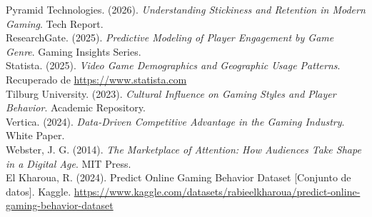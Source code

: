 \documentclass[oneside,11pt]{Latex/Classes/PhDthesisPSnPDF}
\begin{document}
Pyramid Technologies. (2026). \emph{Understanding Stickiness and
Retention in Modern Gaming}. Tech Report.\\

ResearchGate. (2025). \emph{Predictive Modeling of Player Engagement by
Game Genre}. Gaming Insights Series.\\

Statista. (2025). \emph{Video Game Demographics and Geographic Usage
Patterns}. Recuperado de \url{https://www.statista.com}\\

Tilburg University. (2023). \emph{Cultural Influence on Gaming Styles
and Player Behavior}. Academic Repository.\\

Vertica. (2024). \emph{Data-Driven Competitive Advantage in the Gaming
Industry}. White Paper.\\

Webster, J. G. (2014). \emph{The Marketplace of Attention: How Audiences
Take Shape in a Digital Age}. MIT Press.\\

El Kharoua, R. (2024). Predict Online Gaming Behavior Dataset
{[}Conjunto de datos{]}. Kaggle.
\url{https://www.kaggle.com/datasets/rabieelkharoua/predict-online-gaming-behavior-dataset}\\

\renewcommand{\bibname}{Lista de Referencias}
 
 

\end{document}
